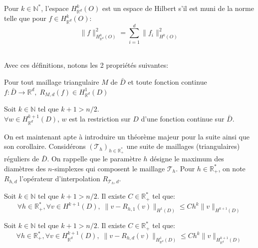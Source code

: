 \begin{property}
  Pour $k \in \mathbb{N}^{*}$, l'espace $H^{k}_{\mathbb{R}^d}(O)$ est un espace de
  Hilbert s'il est muni de la norme
   telle que pour
  $f \in H^{k}_{\mathbb{R}^d}(O)$:
  \begin{equation*} \|f\|_{H^{k}_{\mathbb{R}^d}(O)}^2 = \displaystyle\sum_{i = 1}^d \|f_i\|_{H^{k}(O)}^2  \end{equation*}
\end{property}
~\\
Avec ces définitions, notons les 2 propriétés suivantes:

\begin{property}
Pour tout maillage triangulaire $M$ de $\bar{D}$ et toute fonction continue $f: \bar{D} \rightarrow \mathbb{R}^d, \;R_{M,d}(f) \in H^{1}_{\mathbb{R}^d}(D)$
\end{property}

\begin{property}
Soit $k \in \mathbb{N}$ tel que $k+1 > n/2$.\\$\forall w \in H^{k+1}_{\mathbb{R}^d}(D)$, $w$ est la restriction sur $D$ d'une fonction continue sur $\bar{D}$.
\end{property}

On est maintenant apte à introduire un théorème majeur pour la suite ainsi que son corollaire. Considérons $(\mathcal{T}_h)_{h \in \mathbb{R}^{*}_{+}}$ une suite de maillages (triangulaires) réguliers de $\bar{D}$. On rappelle que le paramètre $h$ désigne le maximum des diamètres des $n$-simplexes qui composent le maillage $\mathcal{T}_h$.
Pour $h \in \mathbb{R}^{*}_{+}$, on note $R_{h,d}$ l'opérateur d'interpolation $R_{\mathcal{T}_h,d}$. 

\begin{theorem}
  Soit $k \in \mathbb{N}$ tel que $k+1 > n/2$. Il existe $C \in \mathbb{R}^{*}_{+}$ tel que:
  \begin{equation*}
    \forall h \in  \mathbb{R}^{*}_{+}, \forall v \in H^{k+1}(D), \;
    \|v - R_{h,1}(v) \|_{H^{1}(D)} \leq C h^k \|v\|_{H^{k+1}(D)}
  \end{equation*}
\end{theorem}

\begin{corollary}
  \label{ineqInterpol}
  Soit $k \in \mathbb{N}$ tel que $k+1 > n/2$. Il existe $C \in \mathbb{R}^{*}_{+}$ tel que:
  \begin{equation*}
    \forall h \in  \mathbb{R}^{*}_{+}, \forall v \in H^{k+1}_{\mathbb{R}^d}(D), \;
    \|v - R_{h,d}(v) \|_{H^{1}_{\mathbb{R}^d}(D)} \leq C h^k \|v\|_{H^{k+1}_{\mathbb{R}^d}(D)}
  \end{equation*}
\end{corollary}


